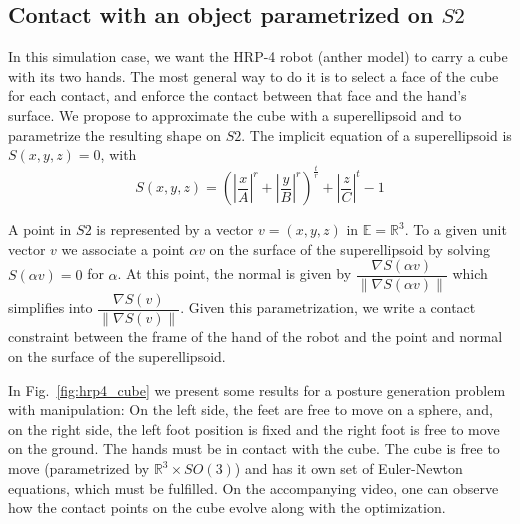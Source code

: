 \subsection{Contact with an object parametrized on $S2$}

In this simulation case, we want the HRP-4 robot (anther model) to carry a cube with its two hands.
The most general way to do it is to select a face of the cube for each contact, and enforce the contact between that face and the hand's surface.
We propose to approximate the cube with a superellipsoid and to parametrize the resulting shape on $S2$.
The implicit equation of a superellipsoid is $S(x,y,z) = 0$, with
\begin{equation}
  S(x,y,z) = \left( \left|\frac{x}{A}\right|^r + \left|\frac{y}{B}\right|^r\right)^\frac{t}{r} + \left|\frac{z}{C}\right|^t - 1
  \label{eq:super_ellipsoid}
\end{equation}

A point in $S2$ is represented by a vector $v=(x,y,z)$ in $\mathbb{E} = \mathbb{R}^3$. To a given unit vector $v$ we associate a point $\alpha v$ on the surface of the superellipsoid by solving $S(\alpha v) = 0$ for $\alpha$. At this point, the normal is given by $\dfrac{\nabla S(\alpha v)}{\left\|\nabla S(\alpha v)\right\|}$ which simplifies into $\dfrac{\nabla S(v)}{\left\|\nabla S(v)\right\|}$.
Given this parametrization, we write a contact constraint between the frame of the hand of the robot and the point and normal on the surface of the superellipsoid.

In Fig.~\ref{fig:hrp4_cube} we present some results for a posture generation problem with manipulation: On the left side, the feet are free to move on a sphere, and, on the right side, the left foot position is fixed and the right foot is free to move on the ground. The hands must be in contact with the cube. The cube is free to move (parametrized by $\mathbb{R}^3 \times SO(3)$) and has it own set of Euler-Newton equations, which must be fulfilled.
On the accompanying video, one can observe how the contact points on the cube evolve along with the optimization.


